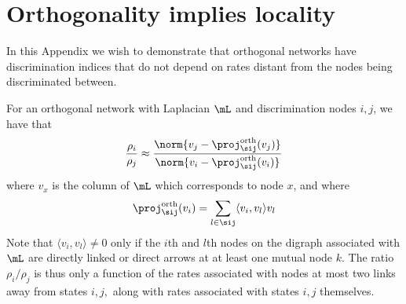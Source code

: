 \section{Orthogonality implies locality}
\label{app_local}
In this Appendix we wish to demonstrate that orthogonal networks have discrimination indices that do not depend on rates distant from the nodes being discriminated between.

For an orthogonal network with Laplacian $\mL$ and discrimination nodes $i, j$, we have that
\[
\frac{\rho_i}{\rho_j} \approx \frac{\norm{v_j - \proj_\sij^{\text{orth}}(v_j)}}{\norm{v_i - \proj_\sij^{\text{orth}}(v_i)}}
\]
where $v_x$ is the column of $\mL$ which corresponds to node $x$, and where
\[
\proj_\sij^{\text{orth}}(v_i) = \sum_{l\in \sij}\langle v_i, v_l \rangle v_l
\]
Note that $\langle v_i, v_l \rangle\neq 0$ only if the $i$th and $l$th nodes on the digraph associated with $\mL$ are directly linked or direct arrows at at least one mutual node $k$.  The ratio ${\rho_i}/{\rho_j}$ is thus only a function of the rates associated with nodes at most two links away from states $i, j,$ along with rates associated with states $i,j$ themselves. 